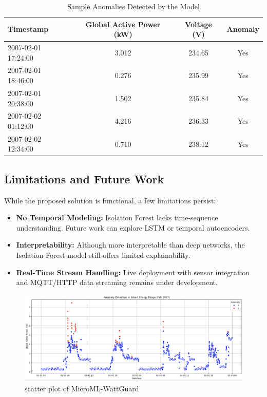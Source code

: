 \documentclass[12pt, draftclsnofoot, onecolumn]{IEEEtran}
\begin{document}
\begin{table}[h!]
	\centering
	\caption{Sample Anomalies Detected by the Model}
	
		\begin{tabular}{|l|c|c|c|}
			\hline
			\textbf{Timestamp} & \textbf{Global Active Power (kW)} & \textbf{Voltage (V)} & \textbf{Anomaly} \\
			\hline
			2007-02-01 17:24:00 & 3.012 & 234.65 & Yes \\
			2007-02-01 18:46:00 & 0.276 & 235.99 & Yes \\
			2007-02-01 20:38:00 & 1.502 & 235.84 & Yes \\
			2007-02-02 01:12:00 & 4.216 & 236.33 & Yes \\
			2007-02-02 12:34:00 & 0.710 & 238.12 & Yes \\
			\hline
		\end{tabular}
	
	\label{table:sample-anomalies}
\end{table}

\subsection{Limitations and Future Work}

While the proposed solution is functional, a few limitations persist:

\begin{itemize}
	\item \textbf{No Temporal Modeling:} Isolation Forest lacks time-sequence understanding. Future work can explore LSTM or temporal autoencoders.
	\item \textbf{Interpretability:} Although more interpretable than deep networks, the Isolation Forest model still offers limited explainability.
	\item \textbf{Real-Time Stream Handling:} Live deployment with sensor integration and MQTT/HTTP data streaming remains under development.
\end{itemize}

\begin{figure}[h!]
	\centering
	\includegraphics[width=1\textwidth]{scatter_plot.png}
	\caption{scatter plot of MicroML-WattGuard}
	\label{fig:scatterplot}
\end{figure}
\end{document}
